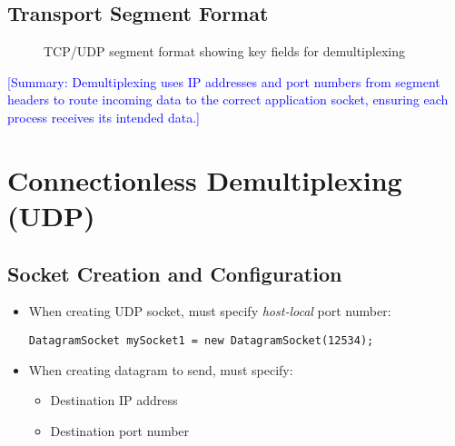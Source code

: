 \documentclass[12pt]{article}
\begin{document}
\subsection{Transport Segment Format}
\begin{figure}[h]
    \centering
    \caption{TCP/UDP segment format showing key fields for demultiplexing}
    \label{fig:segment_format}
\end{figure}

\textcolor{blue}{[Summary: Demultiplexing uses IP addresses and port numbers from segment headers to route incoming data to the correct application socket, ensuring each process receives its intended data.]}

\section{Connectionless Demultiplexing (UDP)}

\subsection{Socket Creation and Configuration}
\begin{itemize}
    \item When creating UDP socket, must specify \textit{host-local} port number:
          \begin{verbatim}
DatagramSocket mySocket1 = new DatagramSocket(12534);
    \end{verbatim}
    \item When creating datagram to send, must specify:
          \begin{itemize}
              \item Destination IP address
              \item Destination port number
          \end{itemize}
\end{itemize}
\end{document}
